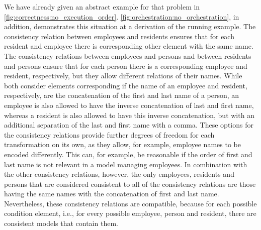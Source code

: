 We have already given an abstract example for that problem in \autoref{fig:correctness:no_execution_order}. \autoref{fig:orchestration:no_orchestration}, in addition, demonstrates this situation at a derivation of the running example.
The consistency relation between employees and residents ensures that for each resident and employee there is corresponding other element with the same name.
The consistency relations between employees and persons and between residents and persons ensure that for each person there is a corresponding employee and resident, respectively, but they allow different relations of their names.
While both consider elements corresponding if the name of an employee and resident, respectively, are the concatenation of the first and last name of a person, an employee is also allowed to have the inverse concatenation of last and first name, whereas a resident is also allowed to have this inverse concatenation, but with an additional separation of the last and first name with a comma.
These options for the consistency relations provide further degrees of freedom for each transformation on its own, as they allow, for example, employee names to be encoded differently.
This can, for example, be reasonable if the order of first and last name is not relevant in a model managing employees.
In combination with the other consistency relations, however, the only employees, residents and persons that are considered consistent to all of the consistency relations are those having the same names with the concatenation of first and last name.
Nevertheless, these consistency relations are compatible, because for each possible condition element, i.e., for every possible employee, person and resident, there are consistent models that contain them.


